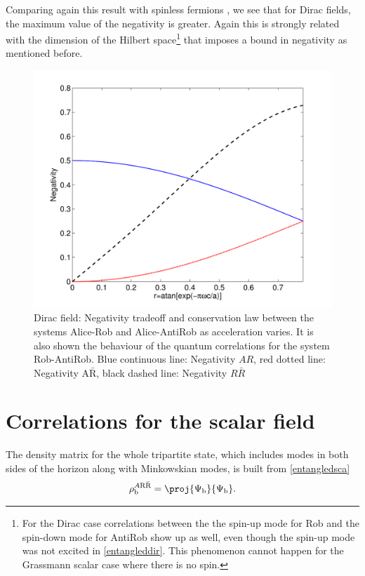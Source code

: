 Comparing again this result with spinless fermions \cite{AlsingSchul}, we see that for Dirac fields, the maximum value of the negativity is greater. Again this is strongly related with the dimension of the Hilbert space\footnote{For the Dirac case correlations between the the spin-up mode for Rob and the spin-down mode for AntiRob show up as well, even though the spin-up mode was not excited in \eqref{entangleddir}. This phenomenon cannot happen for the Grassmann scalar case where there is no spin.} that imposes a bound in negativity as mentioned before.
\begin{figure}[h]
\begin{center}
\includegraphics[width=.85\textwidth]{negaferm}
\end{center}
\caption{ Dirac field: Negativity tradeoff and conservation law between the systems Alice-Rob and Alice-AntiRob  as acceleration varies. It is also shown the behaviour of the quantum correlations for the system Rob-AntiRob. Blue continuous line: Negativity $AR$, red dotted line: Negativity $\text{A}{\bar{\text{R}}}$, black dashed line: Negativity $R\bar R$ }
\label{negaferm}
\end{figure}




\section{Correlations for the scalar field}\label{sec5}

The density matrix for the whole tripartite state, which includes modes in both sides of the horizon along with Minkowskian modes, is built from \eqref{entangledsca}
\begin{equation}\label{tripasca}
\rho^{A\text{R}{\bar{\text{R}}}}_\text{b}=\proj{\Psi_\text{b}}{\Psi_\text{b}}.
\end{equation}

